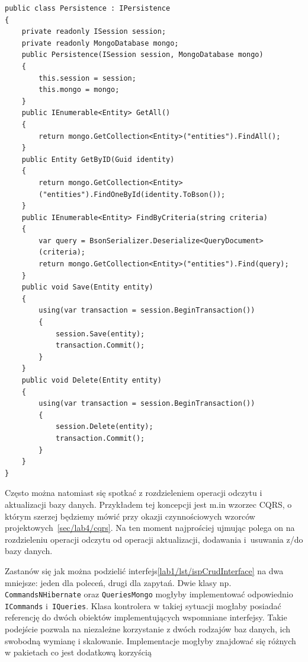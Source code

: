 \begin{lstlisting}[caption={Implementacja interfejsu \texttt{IPersistence}}, label={lab1/lst/ispCrudInterfaceImplementation}]
public class Persistence : IPersistence
{
	private readonly ISession session;
	private readonly MongoDatabase mongo;
	public Persistence(ISession session, MongoDatabase mongo)
	{
		this.session = session;
		this.mongo = mongo;
	}
	public IEnumerable<Entity> GetAll()
	{
		return mongo.GetCollection<Entity>("entities").FindAll();
	}
	public Entity GetByID(Guid identity)
	{
		return mongo.GetCollection<Entity>
		("entities").FindOneById(identity.ToBson());
	}
	public IEnumerable<Entity> FindByCriteria(string criteria)
	{
		var query = BsonSerializer.Deserialize<QueryDocument>
		(criteria);
		return mongo.GetCollection<Entity>("entities").Find(query);
	}
	public void Save(Entity entity)
	{
		using(var transaction = session.BeginTransaction())
		{
			session.Save(entity);
			transaction.Commit();
		}
	}
	public void Delete(Entity entity)
	{
		using(var transaction = session.BeginTransaction())
		{
			session.Delete(entity);
			transaction.Commit();
		}
	}
}
\end{lstlisting}
Często można natomiast się spotkać z rozdzieleniem operacji odczytu i aktualizacji bazy danych. Przykładem tej koncepcji jest m.in wzorzec CQRS, o którym szerzej będziemy mówić przy okazji czynnościowych wzorców projektowych~\ref{sec/lab4/cqrs}. Na ten moment najprościej ujmując polega on na rozdzieleniu operacji odczytu od operacji aktualizacji, dodawania i~usuwania z/do bazy danych.

Zastanów się jak można podzielić interfejs\ref{lab1/lst/ispCrudInterface} na dwa mniejsze: jeden dla poleceń, drugi dla zapytań. Dwie klasy np. \texttt{CommandsNHibernate} oraz \texttt{QueriesMongo} mogłyby implementować odpowiednio \texttt{ICommands} i~\texttt{IQueries}. Klasa kontrolera w takiej sytuacji mogłaby posiadać referencję do dwóch obiektów implementujących wspomniane interfejsy. Takie podejście pozwala na niezależne korzystanie z dwóch rodzajów baz danych, ich swobodną wymianę i skalowanie. Implementacje mogłyby znajdować się różnych w pakietach co jest dodatkową korzyścią 


